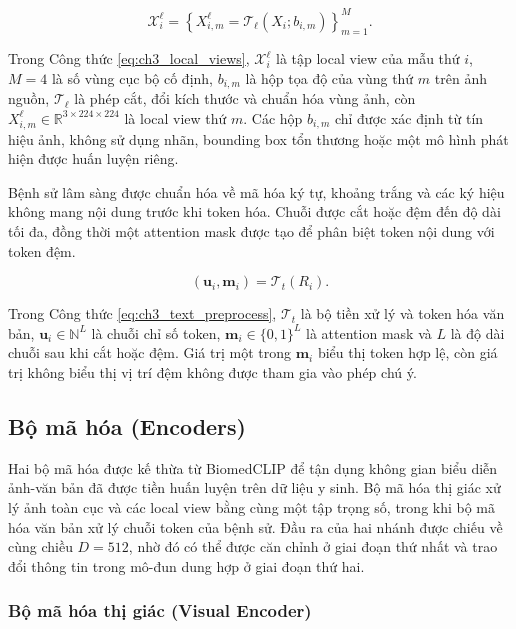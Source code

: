 \begin{equation}\mathcal{X}_i^{\ell}=\left\{X_{i,m}^{\ell}=\mathcal{T}_{\ell}\left(X_i;b_{i,m}\right)\right\}_{m=1}^{M}.\label{eq:ch3_local_views}\end{equation}

Trong Công thức \ref{eq:ch3_local_views}, $\mathcal{X}_i^{\ell}$ là tập local view của mẫu thứ $i$, $M=4$ là số vùng cục bộ cố định, $b_{i,m}$ là hộp tọa độ của vùng thứ $m$ trên ảnh nguồn, $\mathcal{T}_{\ell}$ là phép cắt, đổi kích thước và chuẩn hóa vùng ảnh, còn $X_{i,m}^{\ell}\in\mathbb{R}^{3\times224\times224}$ là local view thứ $m$. Các hộp $b_{i,m}$ chỉ được xác định từ tín hiệu ảnh, không sử dụng nhãn, bounding box tổn thương hoặc một mô hình phát hiện được huấn luyện riêng.

Bệnh sử lâm sàng được chuẩn hóa về mã hóa ký tự, khoảng trắng và các ký hiệu không mang nội dung trước khi token hóa. Chuỗi được cắt hoặc đệm đến độ dài tối đa, đồng thời một attention mask được tạo để phân biệt token nội dung với token đệm.

\begin{equation}\left(\boldsymbol{u}_i,\boldsymbol{m}_i\right)=\mathcal{T}_{t}\left(R_i\right).\label{eq:ch3_text_preprocess}\end{equation}

Trong Công thức \ref{eq:ch3_text_preprocess}, $\mathcal{T}_{t}$ là bộ tiền xử lý và token hóa văn bản, $\boldsymbol{u}_i\in\mathbb{N}^{L}$ là chuỗi chỉ số token, $\boldsymbol{m}_i\in\{0,1\}^{L}$ là attention mask và $L$ là độ dài chuỗi sau khi cắt hoặc đệm. Giá trị một trong $\boldsymbol{m}_i$ biểu thị token hợp lệ, còn giá trị không biểu thị vị trí đệm không được tham gia vào phép chú ý.

\subsection{Bộ mã hóa (Encoders)}

Hai bộ mã hóa được kế thừa từ BiomedCLIP để tận dụng không gian biểu diễn ảnh-văn bản đã được tiền huấn luyện trên dữ liệu y sinh. Bộ mã hóa thị giác xử lý ảnh toàn cục và các local view bằng cùng một tập trọng số, trong khi bộ mã hóa văn bản xử lý chuỗi token của bệnh sử. Đầu ra của hai nhánh được chiếu về cùng chiều $D=512$, nhờ đó có thể được căn chỉnh ở giai đoạn thứ nhất và trao đổi thông tin trong mô-đun dung hợp ở giai đoạn thứ hai.

\subsubsection{Bộ mã hóa thị giác (Visual Encoder)}

